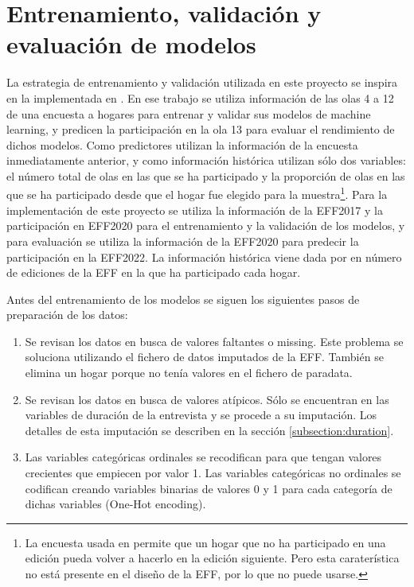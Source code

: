 \section{Entrenamiento, validación y evaluación de modelos}

La estrategia de entrenamiento y validación utilizada en este proyecto se inspira en la implementada en \cite{beste2023case}. En ese trabajo se utiliza información de las olas 4 a 12 de una encuesta a hogares para entrenar y validar sus modelos de machine learning, y predicen la participación en la ola 13 para evaluar el rendimiento de dichos modelos. Como predictores utilizan la información de la encuesta inmediatamente anterior, y como información histórica utilizan sólo dos variables: el número total de olas en las que se ha participado y la proporción de olas en las que se ha participado desde que el hogar fue elegido para la muestra\footnote{La encuesta usada en \cite{beste2023case} permite que un hogar que no ha participado en una edición pueda volver a hacerlo en la edición siguiente. Pero esta caraterística no está presente en el diseño de la EFF, por lo que no puede usarse.}. Para la implementación de este proyecto se utiliza la información de la EFF2017 y la participación en EFF2020 para el entrenamiento y la validación de los modelos, y para evaluación se utiliza la información de la EFF2020 para predecir la participación en la EFF2022. La información histórica viene dada por en número de ediciones de la EFF en la que ha participado cada hogar.

Antes del entrenamiento de los modelos se siguen los siguientes pasos de preparación de los datos:
\begin{enumerate}
    \item Se revisan los datos en busca de valores faltantes o missing. Este problema se soluciona utilizando el fichero de datos imputados de la EFF. También se elimina un hogar porque no tenía valores en el fichero de paradata.
    \item Se revisan los datos en busca de valores atípicos. Sólo se encuentran en las variables de duración de la entrevista y se procede a su imputación. Los detalles de esta imputación se describen en la sección \ref{subsection:duration}.
    \item Las variables categóricas ordinales se recodifican para que tengan valores crecientes que empiecen por valor 1. Las variables categóricas no ordinales se codifican creando variables binarias de valores 0 y 1 para cada categoría de dichas variables (One-Hot encoding).
\end{enumerate}

